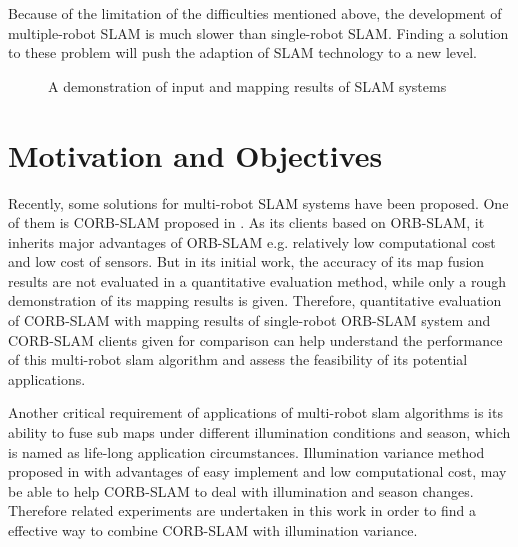 Because of the limitation of the difficulties mentioned above, the development of multiple-robot SLAM is much slower than single-robot SLAM. Finding a solution to these problem will push the adaption of SLAM technology to a new level.

\begin{figure}
	\centering
	\caption{A demonstration of input and mapping results of SLAM systems}
	\label{fig:backgroundslam}
\end{figure}

\section{Motivation and Objectives}

Recently, some solutions for multi-robot SLAM systems have been proposed. One of them is CORB-SLAM proposed in \cite{li2017corb}. As its clients based on ORB-SLAM, it inherits major advantages of ORB-SLAM e.g. relatively low computational cost and low cost of sensors. But in its initial work, the accuracy of its map fusion results are not evaluated in a quantitative evaluation method, while only a rough demonstration of its mapping results is given. Therefore, quantitative evaluation of CORB-SLAM with mapping results of single-robot ORB-SLAM system and CORB-SLAM clients given for comparison can help understand the performance of this multi-robot slam algorithm and assess the feasibility of its potential applications.

Another critical requirement of applications of multi-robot slam algorithms is its ability to fuse sub maps under different illumination conditions and season, which is named as life-long application circumstances. Illumination variance method proposed in \cite{maddern2014illumination}  with advantages of easy implement and low computational cost, may be able to help CORB-SLAM to deal with illumination and season changes. Therefore related experiments are undertaken in this work in order to find a effective way to combine CORB-SLAM with illumination variance.

